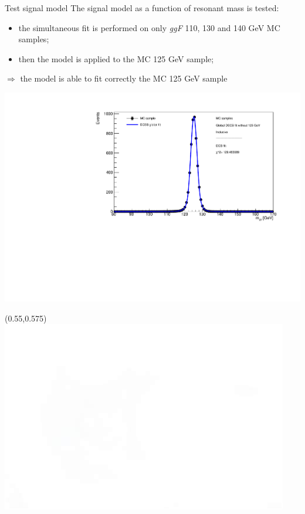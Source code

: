 \documentclass[10pt,UKenglish, leqno, xcolor = dvipsnames]{beamer}
\begin{document}
	\begin{frame}{Test signal model}
		\vfill
		The signal model as a function of resonant mass is tested:
		\begin{itemize}
			\item the simultaneous fit is performed on only \textit{ggF} 110, 130 and 140 GeV MC samples;
			\item then the model is applied to the MC 125 GeV sample;
		\end{itemize}
		
		\vspace{.5cm}
		\begin{center}
			$\Rightarrow$ the model is able to fit correctly the MC 125 GeV sample
			
			\includegraphics[width=.7\textwidth]{Pres_Images/myy_125GeV_DCBfit_cutFlow_no125.pdf}
		\end{center}
		\vfill
		\begin{textblock}{}(0.55,0.575)
			\includegraphics[width=.2\textwidth]{Pres_Images/white.jpeg}
		\end{textblock}
	\end{frame}
\end{document}
